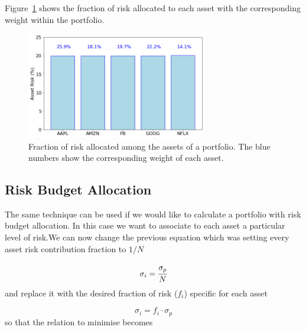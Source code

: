 Figure~\ref{fig:risk_parity} shows the fraction of risk allocated to each asset with the corresponding weight within the portfolio.

\begin{figure}[htb]
\centering
\includegraphics[width=0.7\textwidth]{figures/risk_parity}
\caption{Fraction of risk allocated among the assets of a portfolio. The blue numbers show the corresponding weight of each asset.}
\label{fig:risk_parity}
\end{figure}

\subsection{Risk Budget Allocation}
\label{risk-budget-allocation}

The same technique can be used if we would like to calculate a portfolio with risk budget allocation. In this case we want to associate to each asset a particular level of risk.We can now change the previous equation which was setting every asset risk contribution fraction to $1/N$

\begin{equation} 
\sigma _{i}=\cfrac{\sigma_p}{N} 
\end{equation}
and replace it with the desired fraction of risk (\(f_i\)) specific for each asset

\begin{equation} 
\sigma _{i}=f_i \cdot \sigma_p 
\end{equation}
so that the relation to minimise becomes

